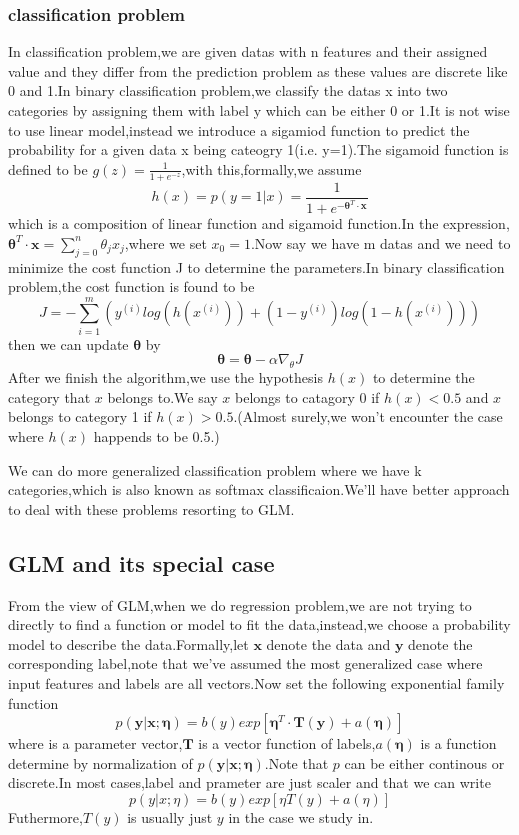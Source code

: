 \documentclass[a4paper,12pt]{article}
\begin{document}
\subsubsection{classification problem}
In classification problem,we are given datas with n features and their assigned value and they differ from the prediction problem as these values are discrete like 0 and 1.In binary classification problem,we classify the datas x into two categories by assigning them with label y which can be either 0 or 1.It is not wise to use linear model,instead we introduce a sigamiod function to predict the probability for a given data x being cateogry 1(i.e. y=1).The sigamoid function is defined to be $g(z)=\frac{1}{1+e^{-z}}$,with this,formally,we assume$$h(x)=p(y=1|x)=\frac{1}{1+e^{-\bm{\theta}^{T}\cdot\bm{x}}}$$
which is a composition of linear function and sigamoid function.In the expression, $\bm{\theta}^{T}\cdot\bm{x}=\sum_{j=0}^{n}\theta_j x_j$,where we set $x_0=1$.Now say we have m datas and we need to minimize the cost function J to determine the parameters.In binary classification problem,the cost function is found to be $$J = -\sum_{i=1}^{m}(y^{(i)}log(h(x^{(i)}))+(1-y^{(i)})log(1-h(x^{(i)})))$$then we can update $\bm{\theta}$ by$$\bm{\theta} = \bm{\theta} -\alpha \nabla_{\theta}J$$
After we finish the algorithm,we use the hypothesis $h(x)$ to determine the category that $x$ belongs to.We say $x$ belongs to catagory 0 if $h(x)<0.5$ and $x$ belongs to category 1 if $h(x)>0.5$.(Almost surely,we won't encounter the case where $h(x)$ happends to be 0.5.)

We can do more generalized classification problem where we have k categories,which is also known as softmax classificaion.We'll have better approach to deal with these problems resorting to GLM.
\subsection{GLM and its special case}
From the view of GLM,when we do regression problem,we are not trying to directly to find a function or model to fit the data,instead,we choose a probability model to describe the data.Formally,let $\bm{x}$ denote the data and $\bm{y}$ denote the corresponding label,note that we've assumed the most generalized case where input features and labels are all vectors.Now set the following exponential family function$$p(\bm{y}|\bm{x};\bm{\eta})=b(y)exp[\bm{\eta}^{T}\cdot \bm{T}(\bm{y})+a(\bm{\eta})]$$where \bm{$\eta$} is a parameter vector,$\bm{T}$ is a vector function of labels,$a(\bm{\eta})$ is a function determine by normalization of $p(\bm{y}|\bm{x};\bm{\eta})$.Note that $p$ can be either continous or discrete.In most cases,label and prameter are just scaler and that we can write$$p(y|x;\eta)=b(y)exp[\eta T(y)+a(\eta)]$$Futhermore,$T(y)$ is usually just $y$ in the case we study in.
\end{document}
